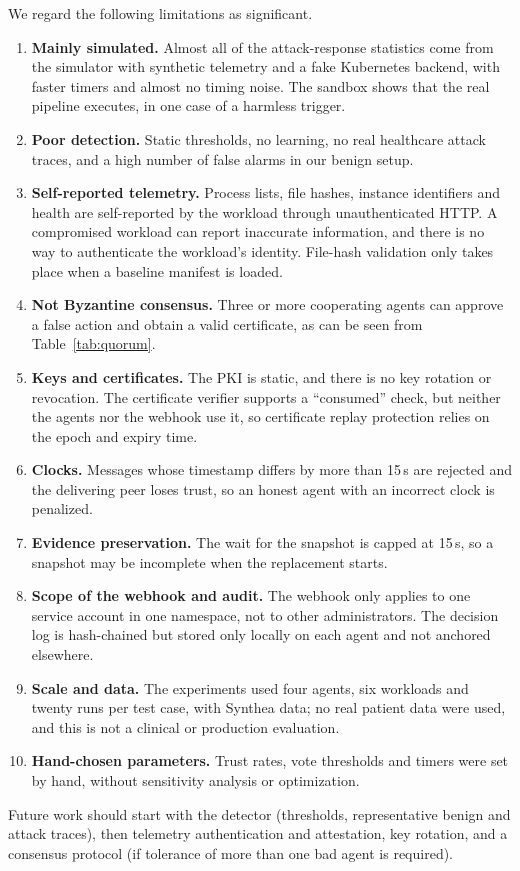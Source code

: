 \documentclass[journal]{IEEEtran}
\begin{document}
We regard the following limitations as significant.
\begin{enumerate}
\item \textbf{Mainly simulated.} Almost all of the attack-response statistics come from the simulator with synthetic telemetry and a fake Kubernetes backend, with faster timers and almost no timing noise. The sandbox shows that the real pipeline executes, in one case of a harmless trigger.
\item \textbf{Poor detection.} Static thresholds, no learning, no real healthcare attack traces, and a high number of false alarms in our benign setup.
\item \textbf{Self-reported telemetry.} Process lists, file hashes, instance identifiers and health are self-reported by the workload through unauthenticated HTTP. A compromised workload can report inaccurate information, and there is no way to authenticate the workload's identity. File-hash validation only takes place when a baseline manifest is loaded.
\item \textbf{Not Byzantine consensus.} Three or more cooperating agents can approve a false action and obtain a valid certificate, as can be seen from Table~\ref{tab:quorum}.
\item \textbf{Keys and certificates.} The PKI is static, and there is no key rotation or revocation. The certificate verifier supports a ``consumed'' check, but neither the agents nor the webhook use it, so certificate replay protection relies on the epoch and expiry time.
\item \textbf{Clocks.} Messages whose timestamp differs by more than 15\,s are rejected and the delivering peer loses trust, so an honest agent with an incorrect clock is penalized.
\item \textbf{Evidence preservation.} The wait for the snapshot is capped at 15\,s, so a snapshot may be incomplete when the replacement starts.
\item \textbf{Scope of the webhook and audit.} The webhook only applies to one service account in one namespace, not to other administrators. The decision log is hash-chained but stored only locally on each agent and not anchored elsewhere.
\item \textbf{Scale and data.} The experiments used four agents, six workloads and twenty runs per test case, with Synthea data; no real patient data were used, and this is not a clinical or production evaluation.
\item \textbf{Hand-chosen parameters.} Trust rates, vote thresholds and timers were set by hand, without sensitivity analysis or optimization.
\end{enumerate}
Future work should start with the detector (thresholds, representative benign and attack traces), then telemetry authentication and attestation, key rotation, and a consensus protocol (if tolerance of more than one bad agent is required).
\end{document}
